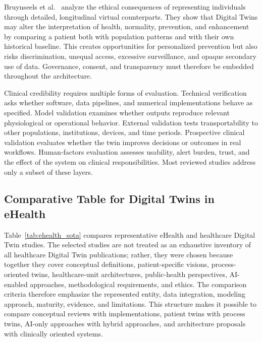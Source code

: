 Bruynseels et al.~\cite{bruynseels2018digital} analyze the ethical consequences of representing individuals through detailed, longitudinal virtual counterparts. They show that Digital Twins may alter the interpretation of health, normality, prevention, and enhancement by comparing a patient both with population patterns and with their own historical baseline. This creates opportunities for personalized prevention but also risks discrimination, unequal access, excessive surveillance, and opaque secondary use of data. Governance, consent, and transparency must therefore be embedded throughout the architecture.

Clinical credibility requires multiple forms of evaluation. Technical verification asks whether software, data pipelines, and numerical implementations behave as specified. Model validation examines whether outputs reproduce relevant physiological or operational behavior. External validation tests transportability to other populations, institutions, devices, and time periods. Prospective clinical validation evaluates whether the twin improves decisions or outcomes in real workflows. Human-factors evaluation assesses usability, alert burden, trust, and the effect of the system on clinical responsibilities. Most reviewed studies address only a subset of these layers.

\subsection{Comparative Table for Digital Twins in eHealth}
Table~\ref{tab:ehealth_sota} compares representative eHealth and healthcare Digital Twin studies. The selected studies are not treated as an exhaustive inventory of all healthcare Digital Twin publications; rather, they were chosen because together they cover conceptual definitions, patient-specific visions, process-oriented twins, healthcare-unit architectures, public-health perspectives, AI-enabled approaches, methodological requirements, and ethics. The comparison criteria therefore emphasize the represented entity, data integration, modeling approach, maturity, evidence, and limitations. This structure makes it possible to compare conceptual reviews with implementations, patient twins with process twins, AI-only approaches with hybrid approaches, and architecture proposals with clinically oriented systems.

